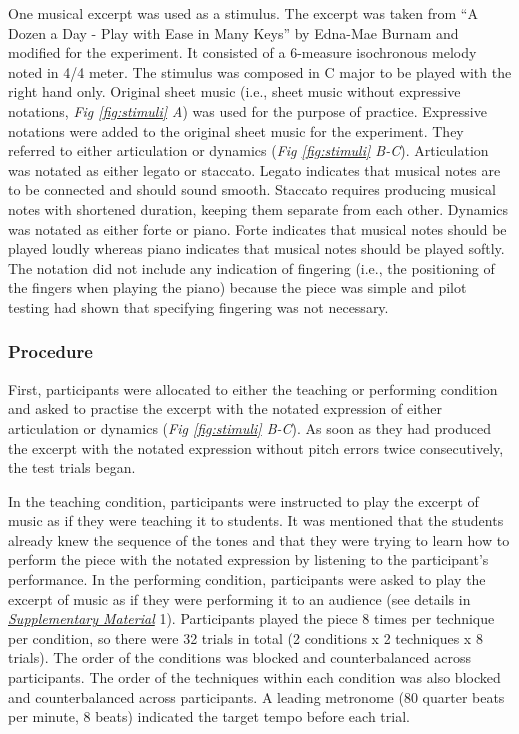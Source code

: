 \documentclass[
  man,floatsintext]{apa6}
\begin{document}
One musical excerpt was used as a stimulus. The excerpt was taken from ``A Dozen a Day - Play with Ease in Many Keys'' by Edna-Mae Burnam and modified for the experiment. It consisted of a 6-measure isochronous melody noted in 4/4 meter. The stimulus was composed in C major to be played with the right hand only. Original sheet music (i.e., sheet music without expressive notations, \emph{Fig \ref{fig:stimuli} A}) was used for the purpose of practice. Expressive notations were added to the original sheet music for the experiment. They referred to either articulation or dynamics (\emph{Fig \ref{fig:stimuli} B-C}). Articulation was notated as either legato or staccato. Legato indicates that musical notes are to be connected and should sound smooth. Staccato requires producing musical notes with shortened duration, keeping them separate from each other. Dynamics was notated as either forte or piano. Forte indicates that musical notes should be played loudly whereas piano indicates that musical notes should be played softly. The notation did not include any indication of fingering (i.e., the positioning of the fingers when playing the piano) because the piece was simple and pilot testing had shown that specifying fingering was not necessary.

\hypertarget{procedure}{%
\subsubsection{Procedure}\label{procedure}}

First, participants were allocated to either the teaching or performing condition and asked to practise the excerpt with the notated expression of either articulation or dynamics (\emph{Fig \ref{fig:stimuli} B-C}). As soon as they had produced the excerpt with the notated expression without pitch errors twice consecutively, the test trials began.

In the teaching condition, participants were instructed to play the excerpt of music as if they were teaching it to students. It was mentioned that the students already knew the sequence of the tones and that they were trying to learn how to perform the piece with the notated expression by listening to the participant's performance. In the performing condition, participants were asked to play the excerpt of music as if they were performing it to an audience (see details in \emph{\protect\hyperlink{supplementary}{Supplementary Material}} 1). Participants played the piece 8 times per technique per condition, so there were 32 trials in total (2 conditions x 2 techniques x 8 trials). The order of the conditions was blocked and counterbalanced across participants. The order of the techniques within each condition was also blocked and counterbalanced across participants. A leading metronome (80 quarter beats per minute, 8 beats) indicated the target tempo before each trial.
\end{document}
